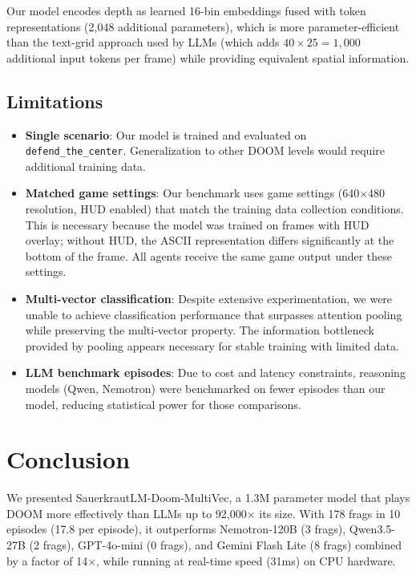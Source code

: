 \documentclass[11pt,a4paper]{article}
\begin{document}
Our model encodes depth as learned 16-bin embeddings fused with token representations (2,048 additional parameters), which is more parameter-efficient than the text-grid approach used by LLMs (which adds $40 \times 25 = 1{,}000$ additional input tokens per frame) while providing equivalent spatial information.

\subsection{Limitations}

\begin{itemize}
    \item \textbf{Single scenario}: Our model is trained and evaluated on \texttt{defend\_the\_center}. Generalization to other DOOM levels would require additional training data.
    \item \textbf{Matched game settings}: Our benchmark uses game settings (640$\times$480 resolution, HUD enabled) that match the training data collection conditions. This is necessary because the model was trained on frames with HUD overlay; without HUD, the ASCII representation differs significantly at the bottom of the frame. All agents receive the same game output under these settings.
    \item \textbf{Multi-vector classification}: Despite extensive experimentation, we were unable to achieve classification performance that surpasses attention pooling while preserving the multi-vector property. The information bottleneck provided by pooling appears necessary for stable training with limited data.
    \item \textbf{LLM benchmark episodes}: Due to cost and latency constraints, reasoning models (Qwen, Nemotron) were benchmarked on fewer episodes than our model, reducing statistical power for those comparisons.
\end{itemize}

\section{Conclusion}
\label{sec:conclusion}

We presented SauerkrautLM-Doom-MultiVec, a 1.3M parameter model that plays DOOM more effectively than LLMs up to 92,000$\times$ its size. With 178 frags in 10 episodes (17.8 per episode), it outperforms Nemotron-120B (3 frags), Qwen3.5-27B (2 frags), GPT-4o-mini (0 frags), and Gemini Flash Lite (8 frags) combined by a factor of 14$\times$, while running at real-time speed (31ms) on CPU hardware.
\end{document}
